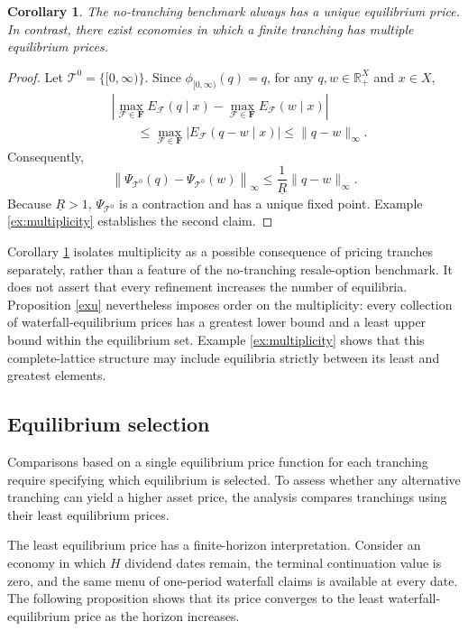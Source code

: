 \documentclass[11pt]{article}
\theoremstyle{plain}
\newtheorem{crl}{Corollary}%
\begin{document}
\begin{crl}\label{cor:tranching-multiplicity}
The no-tranching benchmark always has a unique equilibrium price. In contrast, there exist economies in which a finite tranching has multiple equilibrium prices.
\end{crl}

\begin{proof}
Let $\mathcal{T}^0=\{[0,\infty)\}$. Since $\phi_{[0,\infty)}(q)=q$, for any $q,w\in\mathbb{R}_+^X$ and $x\in X$,
\begin{align*}
&\left|
\max_{\mathcal{F}\in\mathbf{F}}E_\mathcal{F}(q\mid x)
-
\max_{\mathcal{F}\in\mathbf{F}}E_\mathcal{F}(w\mid x)
\right|\\
&\qquad\leq
\max_{\mathcal{F}\in\mathbf{F}}
\left|E_\mathcal{F}(q-w\mid x)\right|
\leq
\lVert q-w\rVert_\infty.
\end{align*}
Consequently,
\[
\left\lVert
\Psi_{\mathcal{T}^0}(q)-\Psi_{\mathcal{T}^0}(w)
\right\rVert_\infty
\leq
\frac{1}{\underline R}\lVert q-w\rVert_\infty.
\]
Because $\underline R>1$, $\Psi_{\mathcal{T}^0}$ is a contraction and has a unique fixed point. Example \ref{ex:multiplicity} establishes the second claim.
\end{proof}

Corollary \ref{cor:tranching-multiplicity} isolates multiplicity as a possible consequence of pricing tranches separately, rather than a feature of the no-tranching resale-option benchmark. It does not assert that every refinement increases the number of equilibria.
Proposition \ref{exu} nevertheless imposes order on the multiplicity: every collection of waterfall-equilibrium prices has a greatest lower bound and a least upper bound within the equilibrium set. Example \ref{ex:multiplicity} shows that this complete-lattice structure may include equilibria strictly between its least and greatest elements.

\subsection{Equilibrium selection}\label{sec:selection}

Comparisons based on a single equilibrium price function for each tranching require specifying which equilibrium is selected. To assess whether any alternative tranching can yield a higher asset price, the analysis compares tranchings using their least equilibrium prices.

The least equilibrium price has a finite-horizon interpretation. Consider an economy in which $H$ dividend dates remain, the terminal continuation value is zero, and the same menu of one-period waterfall claims is available at every date. The following proposition shows that its price converges to the least waterfall-equilibrium price as the horizon increases.
\end{document}
